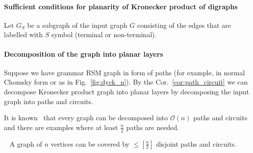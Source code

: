 \paragraph{Sufficient conditions for planarity of Kronecker product of digraphs}

Let $G_S$ be a subgraph of the input graph $G$ consisting of the edges that are labelled with $S$ symbol (terminal or non-terminal).




\paragraph{Decomposition of the graph into planar layers}

Suppose we have grammar RSM graph in form of paths (for example, in normal Chomsky form or as in Fig.~\ref{fig:dyck_n}). By the Cor.~\ref{cor:path_circuit} we can decompose Kronecker product graph into planar layers by decomposing the input graph into paths and circuits.



It is known~\cite{lovasz1968covering} that every graph can be decomposed into $\mathcal{O}(n)$ paths and circuits and there are examples where at least $\frac{n}{2}$ paths are needed.

\begin{theorem}~\cite{lovasz1968covering}
A graph of $n$ vertices can be covered by $\leq \left[ \frac{n}{2} \right]$ disjoint paths and circuits.
\end{theorem}

